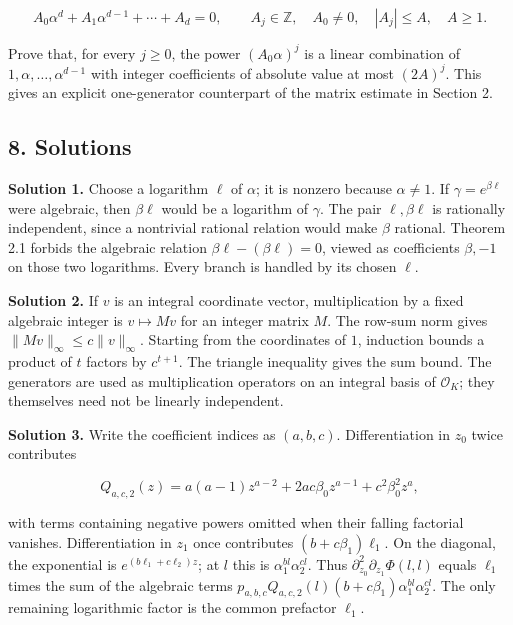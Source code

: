 \documentclass[
  11pt,
  a4paper,
]{article}
\begin{document}
\[
A_0\alpha^d+A_1\alpha^{d-1}+\cdots+A_d=0,
\qquad A_j\in\mathbb Z,\quad A_0\ne0,\quad |A_j|\le A,\quad A\ge1.
\]

Prove that, for every \(j\ge0\), the power \((A_0\alpha)^j\) is a linear
combination of \(1,\alpha,\ldots,\alpha^{d-1}\) with integer
coefficients of absolute value at most \((2A)^j\). This gives an
explicit one-generator counterpart of the matrix estimate in Section 2.

\subsection{8. Solutions}\label{solutions}

\textbf{Solution 1.} Choose a logarithm \(\ell\) of \(\alpha\); it is
nonzero because \(\alpha\ne1\). If \(\gamma=e^{\beta\ell}\) were
algebraic, then \(\beta\ell\) would be a logarithm of \(\gamma\). The
pair \(\ell,\beta\ell\) is rationally independent, since a nontrivial
rational relation would make \(\beta\) rational. Theorem 2.1 forbids the
algebraic relation \(\beta\ell-(\beta\ell)=0\), viewed as coefficients
\(\beta,-1\) on those two logarithms. Every branch is handled by its
chosen \(\ell\).

\textbf{Solution 2.} If \(v\) is an integral coordinate vector,
multiplication by a fixed algebraic integer is \(v\mapsto Mv\) for an
integer matrix \(M\). The row-sum norm gives
\(\|Mv\|_\infty\le c\|v\|_\infty\). Starting from the coordinates of
\(1\), induction bounds a product of \(t\) factors by \(c^{t+1}\). The
triangle inequality gives the sum bound. The generators are used as
multiplication operators on an integral basis of \(\mathcal O_K\); they
themselves need not be linearly independent.

\textbf{Solution 3.} Write the coefficient indices as \((a,b,c)\).
Differentiation in \(z_0\) twice contributes

\[
Q_{a,c,2}(z)=a(a-1)z^{a-2}
+2ac\beta_0z^{a-1}+c^2\beta_0^2z^a,
\]

with terms containing negative powers omitted when their falling
factorial vanishes. Differentiation in \(z_1\) once contributes
\((b+c\beta_1)\ell_1\). On the diagonal, the exponential is
\(e^{(b\ell_1+c\ell_2)z}\); at \(l\) this is
\(\alpha_1^{bl}\alpha_2^{cl}\). Thus
\(\partial_{z_0}^2\partial_{z_1}\Phi(l,l)\) equals \(\ell_1\) times the
sum of the algebraic terms
\(p_{a,b,c}Q_{a,c,2}(l)(b+c\beta_1)\alpha_1^{bl}\alpha_2^{cl}\). The
only remaining logarithmic factor is the common prefactor \(\ell_1\).
\end{document}
